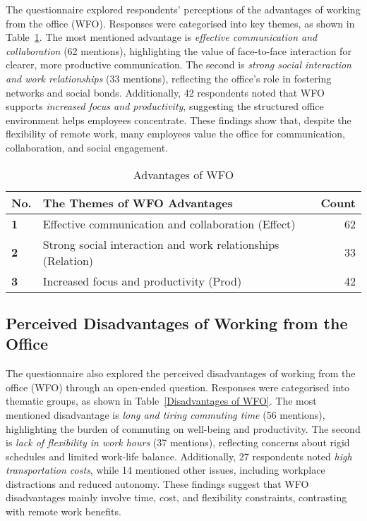\documentclass{infotel}
\begin{document}
The questionnaire explored respondents' perceptions of the advantages of working from the office (WFO). Responses were categorised into key themes, as shown in Table~\ref{Advantage of WFO}. The most mentioned advantage is \textit{effective communication and collaboration} (62 mentions), highlighting the value of face-to-face interaction for clearer, more productive communication. The second is \textit{strong social interaction and work relationships} (33 mentions), reflecting the office's role in fostering networks and social bonds. Additionally, 42 respondents noted that WFO supports \textit{increased focus and productivity}, suggesting the structured office environment helps employees concentrate. These findings show that, despite the flexibility of remote work, many employees value the office for communication, collaboration, and social engagement.



\renewcommand{\arraystretch}{1.3}
\begin{table}
	\centering
	\caption{Advantages of WFO}
	\label{Advantage of WFO}
	\begin{tabular}{p{} p{} r}
		\hline
		\textbf{No.} & \textbf{The Themes of WFO Advantages} & \textbf{Count} \\ 
		\hline
		\textbf{1} & Effective communication and collaboration (Effect) & 62 \\ 
		\textbf{2} & Strong social interaction and work relationships (Relation) & 33 \\ 
		\textbf{3} & Increased focus and productivity (Prod) & 42 \\ 
		\hline
	\end{tabular}
\end{table}


\subsection{Perceived Disadvantages of Working from the Office}
\label{sec:disadvantage-wfo}

The questionnaire also explored the perceived disadvantages of working from the office (WFO) through an open-ended question. Responses were categorised into thematic groups, as shown in Table~\ref{Disadvantages of WFO}. The most mentioned disadvantage is \textit{long and tiring commuting time} (56 mentions), highlighting the burden of commuting on well-being and productivity. The second is \textit{lack of flexibility in work hours} (37 mentions), reflecting concerns about rigid schedules and limited work-life balance. Additionally, 27 respondents noted \textit{high transportation costs}, while 14 mentioned other issues, including workplace distractions and reduced autonomy. These findings suggest that WFO disadvantages mainly involve time, cost, and flexibility constraints, contrasting with remote work benefits.
\end{document}
